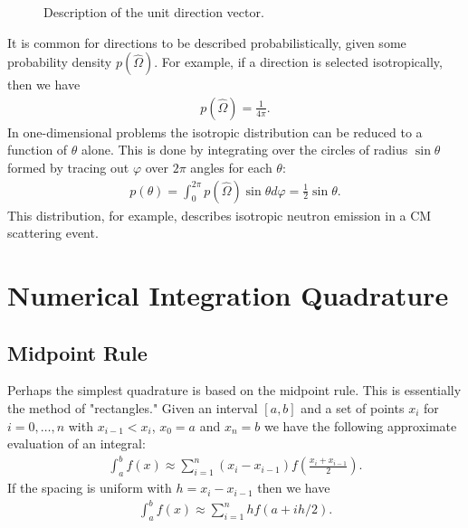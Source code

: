 \documentclass[11pt]{article}
\begin{document}
\begin{figure}
\centering
{}
\caption{Description of the unit direction vector.}
\label{fig::unitDirection}
\end{figure}

It is common for directions to be described probabilistically, given some probability density \(p\left(\hat{\Omega}\right)\).  For example, if a direction is selected isotropically, then we have
\begin{align}
  p\left(\hat{\Omega}\right) = \frac{1}{4\pi}.
\end{align}
In one-dimensional problems the isotropic distribution can be reduced to a function of \(\theta\) alone.  This is done by integrating over the circles of radius \(\sin\theta\) formed by tracing out \(\varphi\) over \(2\pi\) angles for each \(\theta\):
\begin{align}
  p(\theta) = \int_0^{2\pi} p\left(\hat{\Omega}\right) \sin\theta d\varphi
            = \frac{1}{2} \sin\theta.
\end{align}
This distribution, for example, describes isotropic neutron emission in a CM scattering event.

\section{Numerical Integration Quadrature}
\label{sec:orgheadline11}
\subsection{Midpoint Rule}
\label{sec:orgheadline9}
Perhaps the simplest quadrature is based on the midpoint rule.  This is essentially the method of "rectangles."  Given an interval \([a,b]\) and a set of points \(x_i\) for \(i=0,\hdots,n\) with \(x_{i-1} < x_i\), \(x_0 = a\) and \(x_n = b\) we have the following approximate evaluation of an integral:
\begin{align}
  \int_a^b f(x) \approx \sum_{i=1}^n \left( x_i - x_{i-1} \right) f\left(\frac{x_i+x_{i-1}}{2}\right).
\end{align}
If the spacing is uniform with \(h = x_i - x_{i-1}\) then we have
\begin{align}
  \int_a^b f(x) \approx \sum_{i=1}^n h f\left(a + ih/2\right).
\end{align}
\end{document}
